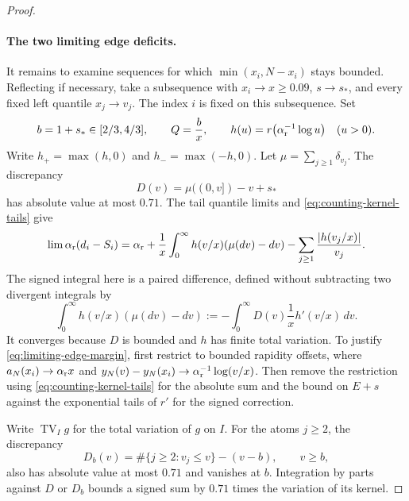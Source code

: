 \begin{proof}
\paragraph{The two limiting edge deficits.}
It remains to examine sequences for which \(\min(x_i,N-x_i)\) stays bounded. Reflecting if necessary, take a subsequence with \(x_i\to x\ge0.09\), \(s\to s_*\), and every fixed left quantile \(x_j\to v_j\). The index \(i\) is fixed on this subsequence. Set
\[
 b=1+s_*\in[2/3,4/3],\qquad Q=\frac bx,\qquad
 h(u)=r\bigl(\alpha_{\rm r}^{-1}\log u\bigr)\quad(u>0).
\]
Write \(h_+=\max(h,0)\) and \(h_-=\max(-h,0)\).
Let \(\mu=\sum_{j\ge1}\delta_{v_j}\). The discrepancy
\[
 D(v)=\mu((0,v])-v+s_*
\]
has absolute value at most \(0.71\). The tail quantile limits and
\eqref{eq:counting-kernel-tails} give
\begin{equation}\label{eq:limiting-edge-margin}
 \lim\alpha_{\rm r}(d_i-S_i)
 =\alpha_{\rm r}
 +\frac1x\int_0^\infty h(v/x)(\mu(dv)-dv)
 -\sum_{j\ge1}\frac{|h(v_j/x)|}{v_j}.
\end{equation}
The signed integral here is a paired difference, defined without subtracting two divergent integrals by
\[
 \int_0^\infty h(v/x)(\mu(dv)-dv)
 :=-\int_0^\infty D(v)\frac1x h'(v/x)\,dv.
\]
It converges because \(D\) is bounded and \(h\) has finite total variation. To justify \eqref{eq:limiting-edge-margin}, first restrict to bounded rapidity offsets, where
\(a_N(x_i)\to\alpha_{\rm r}x\) and
\(y_N(v)-y_N(x_i)\to\alpha_{\rm r}^{-1}\log(v/x)\).
Then remove the restriction using \eqref{eq:counting-kernel-tails} for the absolute sum and the bound on \(E+s\) against the exponential tails of \(r'\) for the signed correction.

Write \(\operatorname{TV}_I g\) for the total variation of \(g\) on \(I\). For the atoms \(j\ge2\), the discrepancy
\[
 D_b(v)=\#\{j\ge2:v_j\le v\}-(v-b),\qquad v\ge b,
\]
also has absolute value at most \(0.71\) and vanishes at \(b\). Integration by parts against \(D\) or \(D_b\) bounds a signed sum by \(0.71\) times the variation of its kernel.


\end{proof}
